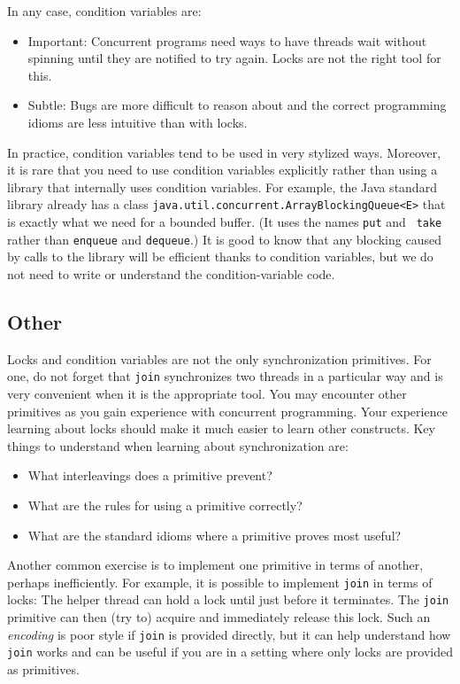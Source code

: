 \documentclass[10pt]{article}
\begin{document}
In any case, condition variables are:
\begin{itemize}
\item Important: Concurrent programs need ways to have threads wait
  without spinning until they are notified to try again.  Locks are
  not the right tool for this.
\item Subtle: Bugs are more difficult to reason about and the
  correct programming idioms are less intuitive than with locks.
\end{itemize}
In practice, condition variables tend to be used in very stylized
ways.  Moreover, it is rare that you need to use condition variables
explicitly rather than using a library that internally uses condition
variables.  For example, the Java standard library already has a class
{\tt java.util.concurrent.ArrayBlockingQueue<E>} that is exactly what
we need for a bounded buffer.  (It uses the names {\tt put} and {\tt
  take} rather than {\tt enqueue} and {\tt dequeue}.)  It is good to
know that any blocking caused by calls to the library will be
efficient thanks to condition variables, but we do not need to write
or understand the condition-variable code.

\subsection{Other}
\label{sec:other-other}

Locks and condition variables are not the only synchronization
primitives.  For one, do not forget that {\tt join} synchronizes two
threads in a particular way and is very convenient when it is the
appropriate tool.  You may encounter other primitives as you gain
experience with concurrent programming.  Your experience
learning about locks should make it much easier to learn other
constructs.  Key things to understand when learning about
synchronization are:
\begin{itemize}
\item What interleavings does a primitive prevent?
\item What are the rules for using a primitive correctly?
\item What are the standard idioms where a primitive proves most
  useful?
\end{itemize}

Another common exercise is to implement one primitive in terms of
another, perhaps inefficiently.  For example, it is possible to
implement {\tt join} in terms of locks: The helper thread can hold a lock
until just before it terminates.  The {\tt join} primitive can then
(try to) acquire and immediately release this lock.  Such an
\emph{encoding} is poor style if {\tt join} is provided directly, but
it can help understand how {\tt join} works and can be useful if you
are in a setting where only locks are provided as primitives.
\end{document}
